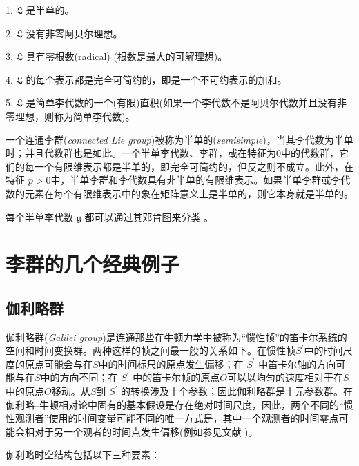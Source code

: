 \documentclass[11pt,fontset=founder]{ctexart}
\begin{document}
1. $\mathfrak{L}$ 是半单的。

2. $\mathfrak{L}$ 没有非零阿贝尔理想。

3. $\mathfrak{L}$ 具有零根数(radical) (根数是最大的可解理想)。

4. $\mathfrak{L}$ 的每个表示都是完全可简约的，即是一个不可约表示的加和。

5. $\mathfrak{L}$ 是简单李代数的一个(有限)直积(如果一个李代数不是阿贝尔代数并且没有非零理想，则称为简单李代数)。

一个连通李群(\textit{connected Lie group})被称为半单的(\emph{semisimple})，当其李代数为半单时；并且代数群也是如此。一个半单李代数、李群，或在特征为$0$中的代数群，它们的每一个有限维表示都是半单的，即完全可简约的，但反之则不成立。此外，在特征 $p>0$中，半单李群和李代数具有非半单的有限维表示。如果半单李群或李代数的元素在每个有限维表示中的象在矩阵意义上是半单的，则它本身就是半单的。

每个半单李代数 $\mathfrak{g}$ 都可以通过其邓肯图来分类 \cite{Helgason}。

\section{李群的几个经典例子}

\subsection{伽利略群}

伽利略群(\textit{Galilei group})是连通那些在牛顿力学中被称为“惯性帧”的笛卡尔系统的空间和时间变换群。两种这样的帧之间最一般的关系如下。在惯性帧$ S^{\prime }$中的时间尺度的原点可能会与在$S$中的时间标尺的原点发生偏移；在 $S^{\prime }$ 中笛卡尔轴的方向可能与在$S$中的方向不同；在 $S^{\prime }$ 中的笛卡尔帧的原点$O$可以以均匀的速度相对于在$S$中的原点$O$移动。从$S$到 $S^{\prime }$ 的转换涉及十个参数；因此伽利略群是十元参数群。在伽利略–牛顿相对论中固有的基本假设是存在绝对时间尺度，因此，两个不同的“惯性观测者”使用的时间变量可能不同的唯一方式是，其中一个观测者的时间零点可能会相对于另一个观者的时间点发生偏移(例如参见文献 \cite{Arnold,GaneshSprBig,GaneshADG})。

伽利略时空结构包括以下三种要素：
\end{document}
